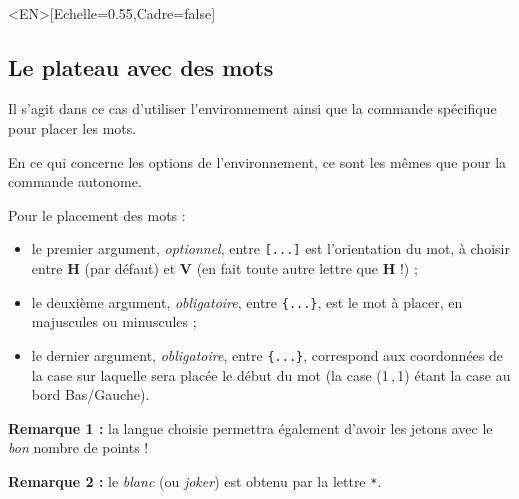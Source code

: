 \documentclass{article}
\newcommand\Cle[1]{{\bfseries\sffamily\textlangle #1\textrangle}}
\begin{document}
\begin{PresentationCode}{}
\PlateauScrabble[Labels=false,Echelle=0.55]\\     %
\PlateauScrabble<EN>[Echelle=0.55,Cadre=false]    %
\end{PresentationCode}

\newpage

\subsection{Le plateau avec des mots}

Il s'agit dans ce cas d'utiliser l'\textsf{environnement} ainsi que la \textsf{commande} spécifique pour placer les mots.

\smallskip

En ce qui concerne les options de l'\textsf{environnement}, ce sont les mêmes que pour la \textsf{commande} autonome.

\smallskip

Pour le placement des mots :

\begin{itemize}
	\item le premier argument, \textit{optionnel}, entre \texttt{[...]} est l'orientation du mot, à choisir entre \Cle{H} (par défaut) et \Cle{V} (en fait toute autre lettre que \Cle{H} !) ;
	\item le deuxième argument, \textit{obligatoire}, entre \texttt{\{...\}}, est le mot à placer, en majuscules ou minuscules ;
	\item le dernier argument, \textit{obligatoire}, entre \texttt{\{...\}}, correspond aux coordonnées de la case sur laquelle sera placée le début du mot (la case (1\,,\,1) étant la case au bord Bas/Gauche).
\end{itemize}

\textbf{Remarque 1 :} la langue choisie permettra également d'avoir les jetons avec le \textit{bon} nombre de points !

\smallskip

\textbf{Remarque 2 :} le \textit{blanc} (ou \textit{joker}) est obtenu par la lettre \texttt{*}.

\begin{PresentationCode}{}
\begin{EnvScrabbleFR}[Echelle=0.75,Labels=false,Aide]
\end{EnvScrabbleFR}
\end{PresentationCode}
\end{document}
